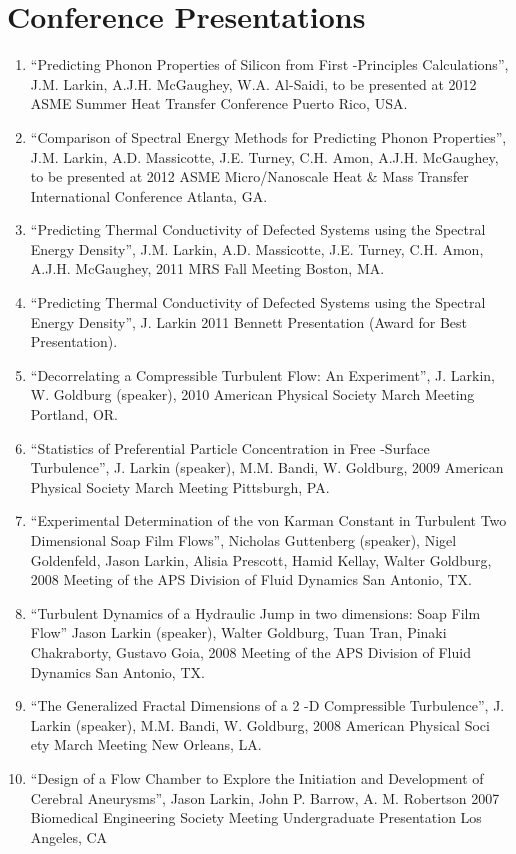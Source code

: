 \documentclass[letterpaper,12pt]{article}
\begin{document}
\section*{Conference Presentations}
\begin{enumerate}
\item “Predicting Phonon Properties of Silicon from First -Principles Calculations”, J.M. Larkin, A.J.H.
McGaughey, W.A. Al-Saidi, to be presented at 2012 ASME Summer Heat Transfer Conference Puerto
Rico, USA.
\item “Comparison of Spectral Energy Methods for Predicting Phonon Properties”, J.M. Larkin, A.D.
Massicotte, J.E. Turney, C.H. Amon, A.J.H. McGaughey, to be presented at 2012 ASME
Micro/Nanoscale Heat \& Mass Transfer International Conference Atlanta, GA.
\item “Predicting Thermal Conductivity of Defected Systems using the Spectral Energy Density”, J.M. Larkin, A.D.
Massicotte, J.E. Turney, C.H. Amon, A.J.H. McGaughey, 2011 MRS Fall Meeting Boston, MA.
\item “Predicting Thermal Conductivity of Defected Systems using the Spectral Energy Density”, J. Larkin
2011 Bennett Presentation (Award for Best Presentation).
\item “Decorrelating a Compressible Turbulent Flow: An Experiment”, J. Larkin, W. Goldburg (speaker),
2010 American Physical Society March Meeting Portland, OR.
\item “Statistics of Preferential Particle Concentration in Free -Surface Turbulence”, J. Larkin (speaker),
M.M. Bandi, W. Goldburg, 2009 American Physical Society March Meeting Pittsburgh, PA.
\item “Experimental Determination of the von Karman Constant in Turbulent Two Dimensional Soap Film
Flows”, Nicholas Guttenberg (speaker), Nigel Goldenfeld, Jason Larkin, Alisia Prescott, Hamid Kellay,
Walter Goldburg, 2008 Meeting of the APS Division of Fluid Dynamics San Antonio, TX.
\item “Turbulent Dynamics of a Hydraulic Jump in two dimensions: Soap Film Flow” Jason Larkin (speaker),
Walter Goldburg, Tuan Tran, Pinaki Chakraborty, Gustavo Goia, 2008 Meeting of the APS Division of
Fluid Dynamics San Antonio, TX.
\item “The Generalized Fractal Dimensions of a 2 -D Compressible Turbulence”, J. Larkin (speaker), M.M.
Bandi, W. Goldburg, 2008 American Physical Soci ety March Meeting New Orleans, LA.
\item “Design of a Flow Chamber to Explore the Initiation and Development of Cerebral Aneurysms”,
Jason Larkin, John P. Barrow, A. M. Robertson 2007 Biomedical Engineering Society Meeting
Undergraduate Presentation Los Angeles, CA
\end{enumerate}
\appendix
\end{document}
